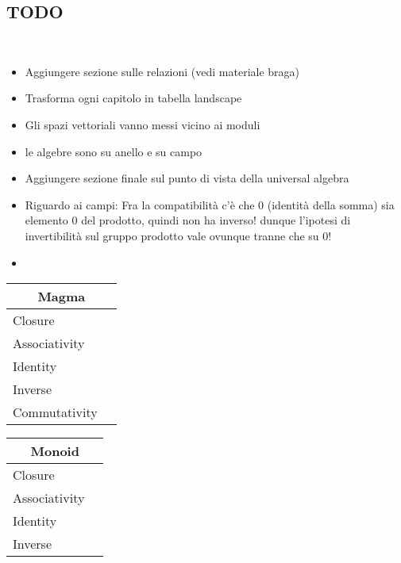 \documentclass[a4paper,12pt]{scrartcl}    %
\begin{document}
\begin{landscape}
\begin{minipage}[c][\textheight]{0.30 \linewidth}
	    \section*{TODO}
	    \mbox{}\\
		\begin{itemize}
			\item Aggiungere sezione sulle relazioni (vedi materiale braga)
			\item Trasforma ogni capitolo in tabella landscape
			\item Gli spazi vettoriali vanno messi vicino ai moduli
			\item le algebre sono su anello e su campo
			\item Aggiungere sezione finale sul punto di vista della universal algebra
			\item Riguardo ai campi: Fra la compatibilità c'è che 0 (identità della somma) sia elemento 0 del prodotto, quindi non ha inverso! dunque l'ipotesi di invertibilità sul gruppo prodotto vale ovunque tranne che su 0!
			\item 
		\end{itemize}	
	\end{minipage}
	\hspace{1cm}
	\begin{minipage}[t][]{0.60 \linewidth}
		\begin{minipage}[c]{0,5\textwidth}	
			\begin{tabular}{|l|p{2cm}|} %
			  \hline
			  \multicolumn{2}{c}{\cellcolor{yellow!25}Magma} \\
			  \hline
			   \cellcolor{blue!25} Closure&  \\
			    \cellcolor{red!25} Associativity&  \\
			    \cellcolor{red!25} Identity&  \\
			    \cellcolor{red!25} Inverse&  \\
			    \cellcolor{red!25} Commutativity&  \\
			  \hline
			\end{tabular}
			\vfill
			\begin{tabular}{|l|p{2cm}|} %
			  \hline
			  \multicolumn{2}{c}{\cellcolor{yellow!25}Monoid} \\
			  \hline
			   \cellcolor{blue!25} Closure&  \\
			    \cellcolor{blue!25} Associativity&  \\
			    \cellcolor{blue!25} Identity&  \\
			    \cellcolor{red!25} Inverse&  \\

\end{tabular}
\end{minipage}
\end{minipage}
\end{landscape}
\end{document}
